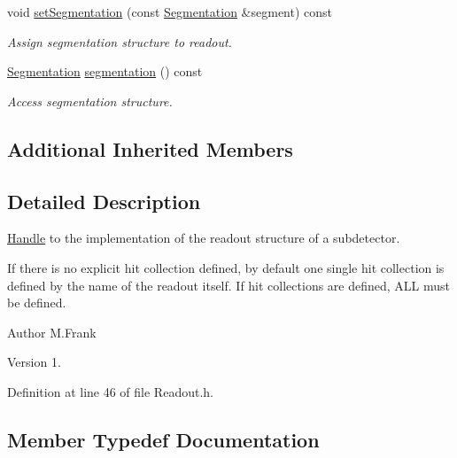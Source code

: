 \begin{DoxyCompactItemize}
void \hyperlink{class_d_d4hep_1_1_geometry_1_1_readout_a5a60acbfd37bf1a420ee2b9254a373da}{set\+Segmentation} (const \hyperlink{class_d_d4hep_1_1_geometry_1_1_segmentation}{Segmentation} \&segment) const
\begin{DoxyCompactList}\small\item\em Assign segmentation structure to readout. \end{DoxyCompactList}\item 
\hyperlink{class_d_d4hep_1_1_geometry_1_1_segmentation}{Segmentation} \hyperlink{class_d_d4hep_1_1_geometry_1_1_readout_ab6e80a6f84cef69b5b567fb46ece6fab}{segmentation} () const
\begin{DoxyCompactList}\small\item\em Access segmentation structure. \end{DoxyCompactList}\end{DoxyCompactItemize}
\subsection*{Additional Inherited Members}


\subsection{Detailed Description}
\hyperlink{class_d_d4hep_1_1_handle}{Handle} to the implementation of the readout structure of a subdetector. 

If there is no explicit hit collection defined, by default one single hit collection is defined by the name of the readout itself. If hit collections are defined, A\+LL must be defined.

\begin{DoxyAuthor}{Author}
M.\+Frank 
\end{DoxyAuthor}
\begin{DoxyVersion}{Version}
1. 
\end{DoxyVersion}


Definition at line 46 of file Readout.\+h.



\subsection{Member Typedef Documentation}
\hypertarget{class_d_d4hep_1_1_geometry_1_1_readout_ac1c39a13ec9bd42d658319fa48cac81d}{}\label{class_d_d4hep_1_1_geometry_1_1_readout_ac1c39a13ec9bd42d658319fa48cac81d} 
